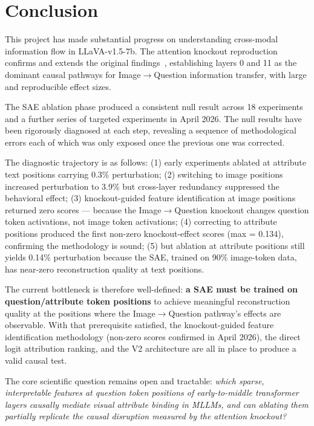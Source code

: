 \documentclass[11pt,a4paper]{article}
\begin{document}
\section{Conclusion}
\label{sec:conclusion}

This project has made substantial progress on understanding cross-modal information flow
in LLaVA-v1.5-7b. The attention knockout reproduction confirms and extends the original
findings~\citep{crossmodal2024}, establishing layers 0 and 11 as the dominant causal
pathways for Image$\to$Question information transfer, with large and reproducible effect sizes.

The SAE ablation phase produced a consistent null result across 18 experiments and a further
series of targeted experiments in April 2026.
The null results have been rigorously diagnosed at each step, revealing a sequence of
methodological errors each of which was only exposed once the previous one was corrected.

The diagnostic trajectory is as follows: (1) early experiments ablated at attribute text positions
carrying 0.3\% perturbation; (2) switching to image positions increased perturbation to 3.9\% but
cross-layer redundancy suppressed the behavioral effect; (3) knockout-guided feature identification
at image positions returned zero scores — because the Image$\to$Question knockout changes question
token activations, not image token activations; (4) correcting to attribute positions produced the
first non-zero knockout-effect scores (max = 0.134), confirming the methodology is sound; (5) but
ablation at attribute positions still yields 0.14\% perturbation because the SAE, trained on 90\%
image-token data, has near-zero reconstruction quality at text positions.

The current bottleneck is therefore well-defined: \textbf{a SAE must be trained on
question/attribute token positions} to achieve meaningful reconstruction quality at the positions
where the Image$\to$Question pathway's effects are observable.
With that prerequisite satisfied, the knockout-guided feature identification methodology
(non-zero scores confirmed in April 2026), the direct logit attribution ranking, and the V2
architecture are all in place to produce a valid causal test.

The core scientific question remains open and tractable: \emph{which sparse, interpretable
features at question token positions of early-to-middle transformer layers causally mediate
visual attribute binding in MLLMs, and can ablating them partially replicate the causal
disruption measured by the attention knockout?}
\end{document}
